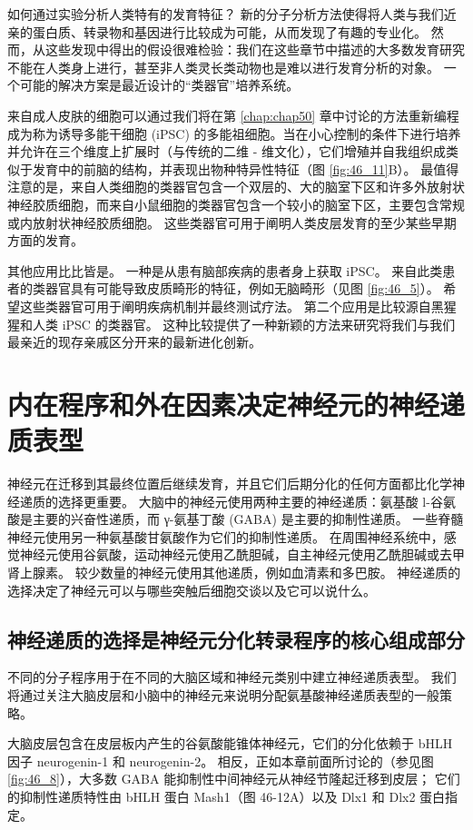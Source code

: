 如何通过实验分析人类特有的发育特征？ 新的分子分析方法使得将人类与我们近亲的蛋白质、转录物和基因进行比较成为可能，从而发现了有趣的专业化。 然而，从这些发现中得出的假设很难检验：我们在这些章节中描述的大多数发育研究不能在人类身上进行，甚至非人类灵长类动物也是难以进行发育分析的对象。 一个可能的解决方案是最近设计的“类器官”培养系统。

来自成人皮肤的细胞可以通过我们将在第 \ref{chap:chap50} 章中讨论的方法重新编程成为称为诱导多能干细胞 (iPSC) 的多能祖细胞。当在小心控制的条件下进行培养并允许在三个维度上扩展时（与传统的二维 - 维文化），它们增殖并自我组织成类似于发育中的前脑的结构，并表现出物种特异性特征（图 \ref{fig:46_11}B）。 最值得注意的是，来自人类细胞的类器官包含一个双层的、大的脑室下区和许多外放射状神经胶质细胞，而来自小鼠细胞的类器官包含一个较小的脑室下区，主要包含常规或内放射状神经胶质细胞。 这些类器官可用于阐明人类皮层发育的至少某些早期方面的发育。

其他应用比比皆是。 一种是从患有脑部疾病的患者身上获取 iPSC。 来自此类患者的类器官具有可能导致皮质畸形的特征，例如无脑畸形（见图 \ref{fig:46_5}）。 希望这些类器官可用于阐明疾病机制并最终测试疗法。 第二个应用是比较源自黑猩猩和人类 iPSC 的类器官。 这种比较提供了一种新颖的方法来研究将我们与我们最亲近的现存亲戚区分开来的最新进化创新。

\section{内在程序和外在因素决定神经元的神经递质表型}
神经元在迁移到其最终位置后继续发育，并且它们后期分化的任何方面都比化学神经递质的选择更重要。 大脑中的神经元使用两种主要的神经递质：氨基酸 l-谷氨酸是主要的兴奋性递质，而 γ-氨基丁酸 (GABA) 是主要的抑制性递质。 一些脊髓神经元使用另一种氨基酸甘氨酸作为它们的抑制性递质。 在周围神经系统中，感觉神经元使用谷氨酸，运动神经元使用乙酰胆碱，自主神经元使用乙酰胆碱或去甲肾上腺素。 较少数量的神经元使用其他递质，例如血清素和多巴胺。 神经递质的选择决定了神经元可以与哪些突触后细胞交谈以及它可以说什么。

\subsection{神经递质的选择是神经元分化转录程序的核心组成部分}
不同的分子程序用于在不同的大脑区域和神经元类别中建立神经递质表型。 我们将通过关注大脑皮层和小脑中的神经元来说明分配氨基酸神经递质表型的一般策略。

大脑皮层包含在皮层板内产生的谷氨酸能锥体神经元，它们的分化依赖于 bHLH 因子 neurogenin-1 和 neurogenin-2。 相反，正如本章前面所讨论的（参见图 \ref{fig:46_8}），大多数 GABA 能抑制性中间神经元从神经节隆起迁移到皮层； 它们的抑制性递质特性由 bHLH 蛋白 Mash1（图 46-12A）以及 Dlx1 和 Dlx2 蛋白指定。

